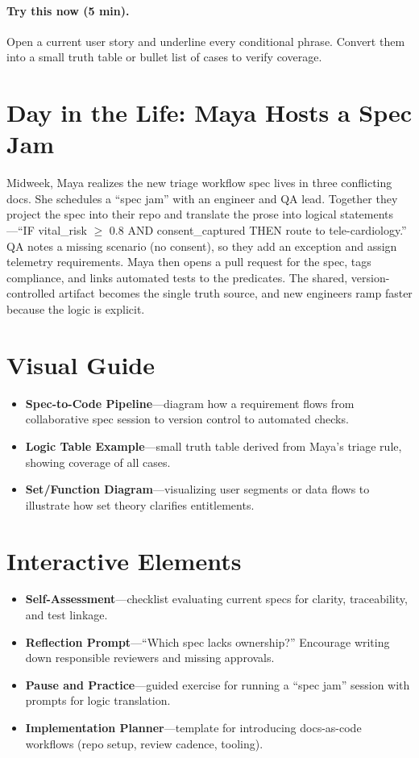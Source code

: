 \paragraph{Try this now (5 min).} Open a current user story and underline every conditional phrase. Convert them into a small truth table or bullet list of cases to verify coverage.

\section{Day in the Life: Maya Hosts a Spec Jam}
Midweek, Maya realizes the new triage workflow spec lives in three conflicting docs. She schedules a ``spec jam'' with an engineer and QA lead. Together they project the spec into their repo and translate the prose into logical statements—``IF vital\_risk $\ge$ 0.8 AND consent\_captured THEN route to tele-cardiology.'' QA notes a missing scenario (no consent), so they add an exception and assign telemetry requirements. Maya then opens a pull request for the spec, tags compliance, and links automated tests to the predicates. The shared, version-controlled artifact becomes the single truth source, and new engineers ramp faster because the logic is explicit.

\section{Visual Guide}
\label{sec:reqspec-visuals}
\begin{itemize}
    \item \textbf{Spec-to-Code Pipeline}—diagram how a requirement flows from collaborative spec session to version control to automated checks.
    \item \textbf{Logic Table Example}—small truth table derived from Maya’s triage rule, showing coverage of all cases.
    \item \textbf{Set/Function Diagram}—visualizing user segments or data flows to illustrate how set theory clarifies entitlements.
\end{itemize}

\section{Interactive Elements}
\label{sec:reqspec-interactive}
\begin{itemize}
    \item \textbf{Self-Assessment}—checklist evaluating current specs for clarity, traceability, and test linkage.
    \item \textbf{Reflection Prompt}—``Which spec lacks ownership?'' Encourage writing down responsible reviewers and missing approvals.
    \item \textbf{Pause and Practice}—guided exercise for running a ``spec jam'' session with prompts for logic translation.
    \item \textbf{Implementation Planner}—template for introducing docs-as-code workflows (repo setup, review cadence, tooling).
\end{itemize}

